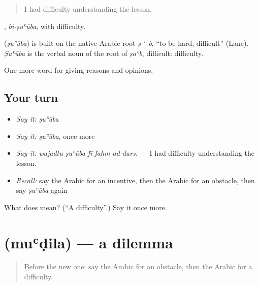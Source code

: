 \begin{quote}
I had difficulty understanding the lesson.
\end{quote}

, \emph{bi-ṣuʿūba}, with difficulty.

\begin{cousinweb}
\textbf{} (\emph{ṣuʿūba}) is built on the native Arabic root \emph{ṣ-ʿ-b}, \textquotedblleft{}to be hard, difficult\textquotedblright{} (Lane). \emph{Ṣuʿūba} is the verbal noun of the root of \emph{ṣaʿb}, difficult: difficulty.
\end{cousinweb}

\begin{grammarlens}[title={What you've built}]
One more word for giving reasons and opinions.
\end{grammarlens}

\subsection*{Your turn}
\begin{itemize}
\raggedright
  \item \emph{Say it:} \emph{ṣuʿūba}
  \item \emph{Say it:} \emph{ṣuʿūba}, once more
  \item \emph{Say it:} \emph{wajadtu ṣuʿūba fī fahm ad-dars.} — I had difficulty understanding the lesson.
  \item \emph{Recall:} say the Arabic for an incentive, then the Arabic for an obstacle, then say \emph{ṣuʿūba} again
\end{itemize}

\begin{tcolorbox}[breakable,colback=teal!4,colframe=teal!35!black,title={Before you move on}]
What does  mean? (\textquotedblleft{}A difficulty\textquotedblright{}.) Say it once more.
\end{tcolorbox}
\section[\texorpdfstring{\ar{معضلة} (muʿḍila)}{معضلة (muʿḍila)}]{ (muʿḍila) — a dilemma}

\label{lesson:AR-C372-mudila}



\begin{quote}
Before the new one: say the Arabic for an obstacle, then the Arabic for a difficulty.
\end{quote}

